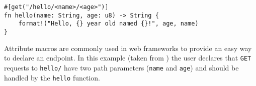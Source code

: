 \begin{listing}
    \centering
    \begin{verbatim}
#[get("/hello/<name>/<age>")]
fn hello(name: String, age: u8) -> String {
    format!("Hello, {} year old named {}!", age, name)
}
    \end{verbatim}
    \caption{
        Attribute macros are commonly used in web frameworks to provide an easy way to declare an endpoint.
        In this example (taken from \autocite{Rocket2021}) the user declares that \texttt{GET} requests to \texttt{hello/}
        have two path parameters (\texttt{name} and \texttt{age}) and should be handled by the \texttt{hello} function.
    }
    \label{lst:rust-rocket-attr}
\end{listing}